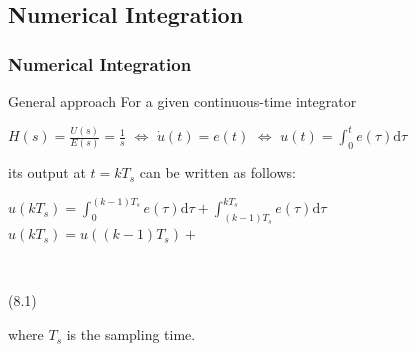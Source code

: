 \subsection{Numerical Integration}

\begin{frame}
	\frametitle{Numerical Integration}
	\begin{block}{General approach}
		For a given continuous-time integrator\\
		\begin{center}
			$H(s) = \frac{U(s)}{E(s)} = \frac{1}{s}$ \hspace{0.5em}
			$\Leftrightarrow$  \hspace{0.5em} $\dot{u}(t)= e(t)$ \hspace{0.5em} $\Leftrightarrow$ \hspace{0.5em} $u(t) = \int_0^t e(\tau)\mathrm{d}\tau$\\
		\end{center}
		
		its output at $t = kT_s$ can be written as follows:\\
		\begin{center}
			$u(kT_s) = \int_0^{(k-1)T_s} e(\tau)\mathrm{d}\tau + \int_{(k-1)T_s}^{kT_s} e(\tau)\mathrm{d}\tau$\\
			$u(kT_s) = u((k-1)T_s)+ $ 
			\begin{cases}
				\\
			\end{cases}
			(8.1)
		\end{center}
		where $T_s$ is the sampling time.
	\end{block}
\end{frame}

